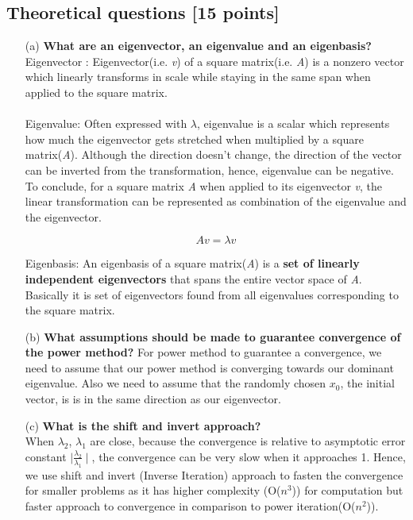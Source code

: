 \documentclass[unicode,11pt,a4paper,oneside,numbers=endperiod,openany]{scrartcl}
\begin{document}
\setassignment
{}

\newline

\assignmentpolicy


\newpage

\subsection{Theoretical questions [15 points]}

\begin{enumerate}
\item[(a)] \textbf{What are an eigenvector, an eigenvalue and an eigenbasis?}\\
{Eigenvector : Eigenvector(i.e. \textit{v}) of a square matrix(i.e. \textit{A}) is a nonzero vector which linearly transforms in scale while staying in the same span when applied to the square matrix.}\\
\\
{Eigenvalue: Often expressed with $\lambda$, eigenvalue is a scalar which represents how much the eigenvector gets stretched when multiplied by a square matrix(\textit{A}). Although the direction doesn't change, the direction of the vector can be inverted from the transformation, hence, eigenvalue can be negative.}\\
To conclude, for a square matrix \textit{A} when applied to its eigenvector \textit{v}, the linear transformation can be represented as combination of the eigenvalue and the eigenvector.
\begin{center}
\begin{equation}
 Av = \lambda v
\end{equation}
\end{center}

{Eigenbasis: An eigenbasis of a square matrix(\textit{A}) is a \textbf{set of linearly independent eigenvectors} that spans the entire vector space of \textit{A}. Basically it is set of eigenvectors found from all eigenvalues corresponding to the square matrix.}
\item[(b)] \textbf{What assumptions should be made to guarantee convergence of the power method?}
For power method to guarantee a convergence, we need to assume that our power method is converging towards our dominant eigenvalue. Also we need to assume that the randomly chosen $x_0$, the initial vector, is is in the same direction as our eigenvector.
\item[(c)] \textbf{What is the shift and invert approach?}\\
{When $\lambda_2$, $\lambda_1$ are close, because the convergence is relative to asymptotic error constant $\mid \frac{\lambda_2}{\lambda_1} \mid$, the convergence can be very slow when it approaches 1. Hence, we use shift and invert (Inverse Iteration) approach to fasten the convergence for smaller problems as it has higher complexity (O($n^{3}$)) for computation but faster approach to convergence in comparison to power iteration(O($n^{2}$)).}\\


\end{enumerate}
\end{document}
